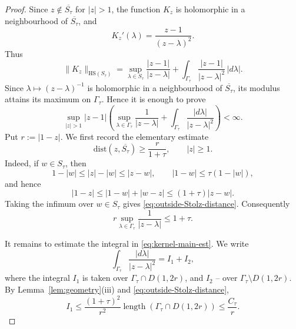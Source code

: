 \documentclass[11pt]{amsart}
\numberwithin{equation}{section}
\theoremstyle{definition}
\theoremstyle{plain}
\def\dist{\mathrm{dist}}
\def\length{\operatorname{length}}
\newcommand{\HS}{\mathrm{HS}}
\begin{document}
\begin{proof}
Since \(z\notin\overline{S_\tau}\) for \(|z|>1\), the function \(K_z\) is
holomorphic in a neighbourhood of \(\overline{S_\tau}\), and
\[
        K_z'(\lambda)=\frac{z-1}{(z-\lambda)^2}.
\]
Thus
\[
        \|K_z\|_{\HS(S_\tau)}
        =
        \sup_{\lambda\in S_\tau}\frac{|z-1|}{|z-\lambda|}
        +
        \int_{\Gamma_\tau}
        \frac{|z-1|}{|z-\lambda|^2}\,|d\lambda| .
\]
Since \(\lambda\mapsto (z-\lambda)^{-1}\) is holomorphic in a
neighbourhood of \(\overline{S_\tau}\), its modulus attains its maximum on
\(\Gamma_\tau\).  Hence it is enough to prove
\begin{equation}\label{eq:kernel-main-est}
        \sup_{|z|>1}
        |z-1|\left(
        \sup_{\lambda \in\Gamma_\tau}\frac1{|z-\lambda|}
        +
        \int_{\Gamma_\tau}\frac{|d\lambda|}{|z-\lambda|^2}
        \right)<\infty .
\end{equation}
Put \(r:=|1-z|\).  We first record the elementary estimate
\begin{equation}\label{eq:outside-Stolz-distance}
        \dist(z,\overline{S_\tau})\ge \frac{r}{1+\tau},
        \qquad |z|\ge1 .
\end{equation}
Indeed, if \(w\in S_\tau\), then
\[
        1-|w|\le |z|-|w|\le |z-w|,
        \qquad
        |1-w|\le \tau(1-|w|),
\]
and hence
\[
        |1-z|\le |1-w|+|w-z|\le (1+\tau)|z-w|.
\]
Taking the infimum over \(w\in S_\tau\) gives
\eqref{eq:outside-Stolz-distance}.  Consequently
\[
  r\sup_{\lambda\in\Gamma_\tau}\frac1{|z-\lambda|}
        \le 1+\tau .
\]

It remains to estimate the integral in \eqref{eq:kernel-main-est}.  
We write
\[
        \int_{\Gamma_\tau}\frac{|d\lambda|}{|z-\lambda|^2}=I_1+I_2,
\]
where the integral \(I_1\) is taken over \(\Gamma_\tau\cap D(1,2r)\), and \(I_2\) -- over
\(\Gamma_\tau\setminus D(1,2r)\).  By Lemma~\ref{lem:geometry}\textup{(iii)}
and \eqref{eq:outside-Stolz-distance},
\[
        I_1
        \le
        \frac{(1+\tau)^2}{r^2}
        \length(\Gamma_\tau\cap D(1,2r))
        \le
        \frac{C_\tau}{r}.
\]


\end{proof}
\end{document}
